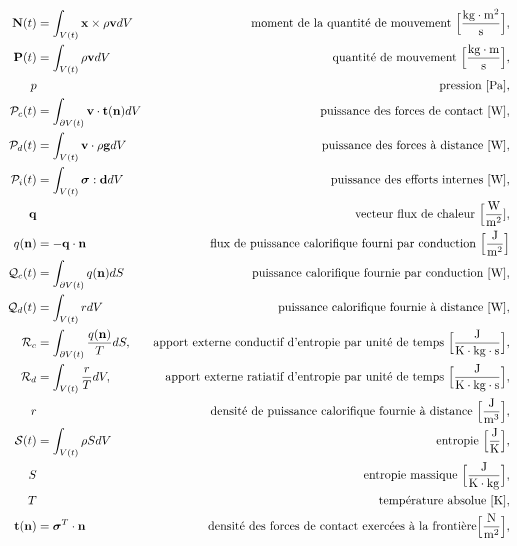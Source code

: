 \begin{align*}
    \mathcal{\vb{N}}(t) &= \int_{V(t)} \vb{x} \times \rho \vb{v} dV & \textrm{moment de la quantité de mouvement } \Big[\si{\frac{kg \cdot  m^2}{s}}\Big],\\
    \mathcal{\vb{P}}(t) &= \int_{V(t)} \rho \vb{v} dV & \textrm{quantité de mouvement } \Big[\si{\frac{kg \cdot m}{s}}\Big],\\
    p & & \textrm{pression } [\si{Pa}],\\
    \mathcal{P}_c(t) &= \int_{\partial V(t)} \vb{v} \cdot \vb{t}(\vb{n}) dV & \textrm{puissance des forces de contact } [\si{W}], \\
    \mathcal{P}_d(t) &= \int_{V(t)} \vb{v} \cdot \rho \vb{g} dV & \textrm{puissance des forces à distance } [\si{W}], \\
    \mathcal{P}_i(t) &= \int_{V(t)} \boldsymbol{\sigma} : \vb{d} dV & \textrm{puissance des efforts internes } [\si{W}],\\
    \vb{q} & & \textrm{vecteur flux de chaleur } \Big[\si{\frac{W}{m^2}}], \\
    q(\vb{n}) &= - \vb{q} \cdot \vb{n} & \textrm{flux de puissance calorifique fourni par conduction } \Big[\si{\frac{J}{m^2}}\Big]\\
    \mathcal{Q}_c(t) &= \int_{\partial V(t)} q(\vb{n}) dS & \textrm{puissance calorifique fournie par conduction } [\si{W}], \\
    \mathcal{Q}_d(t) &= \int_{V(t)} r dV & \textrm{puissance calorifique fournie à distance } [\si{W}], \\
    \mathcal{R}_c &= \int_{\partial V(t)} \frac{q(\vb{n})}{T}dS, & \textrm{apport externe conductif d'entropie par unité de temps }\Big[\si{\frac{J}{K \cdot kg \cdot \s}}\Big],\\
    \mathcal{R}_d &= \int_{V(t)} \frac{r}{T} dV, & \textrm{apport externe ratiatif d'entropie par unité de temps }\Big[\si{\frac{J}{K \cdot kg \cdot s}}\Big],\\
    r & & \textrm{densité de puissance calorifique fournie à distance } \Big[\si{\frac{J}{m^3}}\Big],\\
    \mathcal{S}(t) &= \int_{V(t)} \rho S dV & \textrm{entropie } \Big[\si{\frac{J}{K}}\Big],\\
    S & & \textrm{entropie massique } \Big[\si{\frac{J}{K \cdot kg}}\Big],\\
    T & & \textrm{température absolue } [\si{K}],\\
    \vb{t}(\vb{n}) &= \boldsymbol{\sigma}^T \cdot \vb{n} & \textrm{densité des forces de contact exercées à la frontière} \Big[\si{\frac{N}{m^2}}\Big],\\

\end{align*}
